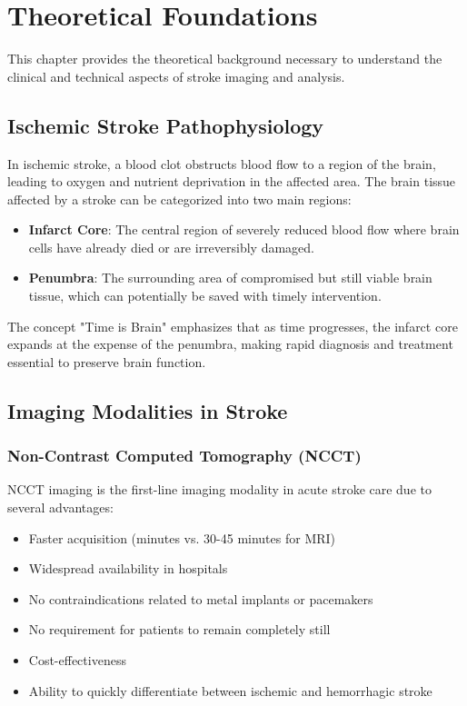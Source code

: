 
\chapter{Theoretical Foundations}\label{chapter:theoretical_foundations}

This chapter provides the theoretical background necessary to understand the clinical and technical aspects of stroke imaging and analysis.

\section{Ischemic Stroke Pathophysiology}

In ischemic stroke, a blood clot obstructs blood flow to a region of the brain, leading to oxygen and nutrient deprivation in the affected area. The brain tissue affected by a stroke can be categorized into two main regions:

\begin{itemize}
    \item \textbf{Infarct Core}: The central region of severely reduced blood flow where brain cells have already died or are irreversibly damaged.
    
    \item \textbf{Penumbra}: The surrounding area of compromised but still viable brain tissue, which can potentially be saved with timely intervention.
\end{itemize}

The concept "Time is Brain" emphasizes that as time progresses, the infarct core expands at the expense of the penumbra, making rapid diagnosis and treatment essential to preserve brain function.

\section{Imaging Modalities in Stroke}
\subsection{Non-Contrast Computed Tomography (NCCT)}

NCCT imaging is the first-line imaging modality in acute stroke care due to several advantages:

\begin{itemize}
    \item Faster acquisition (minutes vs. 30-45 minutes for MRI)
    \item Widespread availability in hospitals
    \item No contraindications related to metal implants or pacemakers
    \item No requirement for patients to remain completely still
    \item Cost-effectiveness
    \item Ability to quickly differentiate between ischemic and hemorrhagic stroke
\end{itemize}

